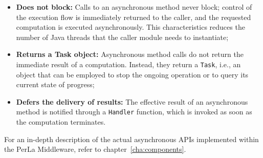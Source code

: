 \begin{itemize}

    \item \textbf{Does not block:} Calls to an asynchronous method never block;
        control of the execution flow is immediately returned to the caller,
        and the requested computation is executed asynchronously. This
        characteristics reduces the number of Java threads that the caller
        module needs to instantiate;

    \item \textbf{Returns a Task object:} Asynchronous method calls do not
        return the immediate result of a computation. Instead, they return a
        \texttt{Task}, i.e., an object that can be employed to stop the ongoing
        operation or to query its current state of progress;

    \item \textbf{Defers the delivery of results:} The effective result of an
        asynchronous method is notified through a \texttt{Handler} function,
        which is invoked as soon as the computation terminates.

\end{itemize}

For an in-depth description of the actual asynchronous APIs implemented within
the PerLa Middleware, refer to chapter~\ref{cha:components}.

